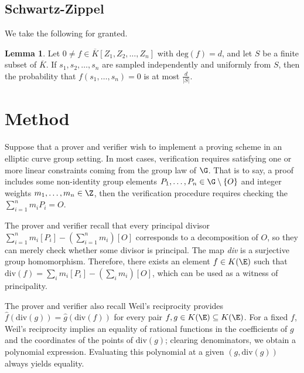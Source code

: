 \documentclass[11pt,letterpaper]{article}
\theoremstyle{definition}
\newtheorem{lemm}[theorem]{Lemma}
\newcommand{\6}{\mathbf}
\newcommand{\7}{\mathcal}
\begin{document}
\subsection{Schwartz-Zippel}

We take the following for granted.

\begin{lemm}
Let $0 \neq f \in \overline{K}[Z_1, Z_2, \ldots, Z_n]$ with $\text{deg}(f) = d$, and let $S$ be a finite subset of $\overline{K}$. If $s_1, s_2, \ldots, s_n$ are sampled independently and uniformly from $S$, then the probability that $f(s_1, \ldots, s_n)=0$ is at most $\frac{d}{\left|S\right|}$.
\end{lemm}



\section{Method}

Suppose that a prover and verifier wish to implement a proving scheme in an elliptic curve group setting. In most cases, verification requires satisfying one or more linear constraints coming from the group law of $\G$. That is to say, a proof includes some non-identity group elements $P_1, \ldots, P_n \in \G \setminus \left\{O\right\}$ and integer weights $m_1, \ldots, m_n \in \Z$, then the verification procedure requires checking the $\sum_{i=1}^{n} m_i P_i = O$.

The prover and verifier recall that every principal divisor $\sum_{i=1}^{n} m_i [P_i] - (\sum_{i=1}^{n} m_i)[O]$ corresponds to a decomposition of $O$, so they can merely check whether some divisor  is principal.
The map \textit{div} is a surjective group homomorphism. Therefore, there exists an element $f \in K(\E)$ such that $\text{div}(f) = \sum_i m_i [P_i] - \left(\sum_i m_i\right)[O]$, which can be used as a witness of principality.


The prover and verifier also recall Weil's reciprocity provides $\widehat{f}(\text{div}(g)) = \widehat{g}(\text{div}(f))$ for every pair $f, g \in K(\E) \subseteq K(\E)$. For a fixed $f$, Weil's reciprocity implies an equality of rational functions in the coefficients of $g$ and the coordinates of the points of $\text{div}(g)$; clearing denominators, we obtain a polynomial expression. Evaluating this polynomial at a given $(g, \text{div}(g))$ always yields equality. 
\end{document}
